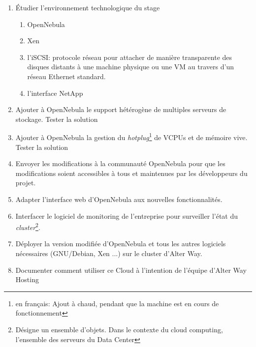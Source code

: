 \begin{enumerate}
	\item Étudier l'environnement technologique du stage
		\begin{enumerate}
		\item OpenNebula
		\item Xen
		\item l'iSCSI: protocole réseau pour attacher de manière transparente des disques distants à une machine physique ou une VM
			au travers d'un réseau Ethernet standard.
		\item l'interface NetApp
		\end{enumerate}
	\item Ajouter à OpenNebula le support hétérogène de multiples serveurs de stockage.
		\subitem Tester la solution
	\item Ajouter à OpenNebula la gestion du \emph{hotplug}\footnote{en français: Ajout à chaud, pendant que la machine est en cours de fonctionnement}
		de VCPUs et de mémoire vive.
		\subitem Tester la solution
	\item Envoyer les modifications à la communauté OpenNebula pour que les modifications soient accessibles à tous et maintenues par les développeurs du projet.
	\item Adapter l'interface web d'OpenNebula aux nouvelles fonctionnalités.
	\item Interfacer le logiciel de monitoring de l'entreprise pour surveiller l'état du \emph{cluster}\footnote{Désigne un ensemble d'objets. Dans le contexte
	du cloud computing, l'ensemble des serveurs du Data Center}.
	\item Déployer la version modifiée d'OpenNebula et tous les autres logiciels nécessaires (GNU/Debian, Xen ...) sur le cluster d'Alter Way.
	\item Documenter comment utiliser ce Cloud à l'intention de l'équipe d'Alter Way Hosting
\end{enumerate}

